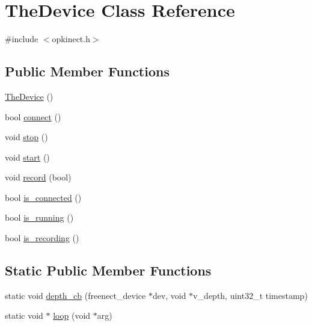 \hypertarget{class_the_device}{\section{The\+Device Class Reference}
\label{class_the_device}
}


{\ttfamily \#include $<$opkinect.\+h$>$}

\subsection*{Public Member Functions}
\begin{DoxyCompactItemize}
\item 
\hyperlink{class_the_device_a397d63518536d848541fbcb564062e91}{The\+Device} ()
\item 
bool \hyperlink{class_the_device_aaad601e00c361e996176237ce5a219c5}{connect} ()
\item 
void \hyperlink{class_the_device_a2b6ba68f94c5d28ba2d146312cfde405}{stop} ()
\item 
void \hyperlink{class_the_device_a99fc93db2519684bc5e6e20fb3c1b1c1}{start} ()
\item 
void \hyperlink{class_the_device_a1e91e4f9382c7aaae2930623f7cadcc8}{record} (bool)
\item 
bool \hyperlink{class_the_device_af983b1f813f7d4287358098c61a98107}{is\+\_\+connected} ()
\item 
bool \hyperlink{class_the_device_a82a0327fc52e2f952c3c9c705094459c}{is\+\_\+running} ()
\item 
bool \hyperlink{class_the_device_a9f3adcc1ff86d8ee612174ad65968181}{is\+\_\+recording} ()
\end{DoxyCompactItemize}
\subsection*{Static Public Member Functions}
\begin{DoxyCompactItemize}
\item 
static void \hyperlink{class_the_device_a2296ca12439d1c640c215453eaf91966}{depth\+\_\+cb} (freenect\+\_\+device $\ast$dev, void $\ast$v\+\_\+depth, uint32\+\_\+t timestamp)
\item 
static void $\ast$ \hyperlink{class_the_device_a03f2256b5a3ccdbb6e73dcfb1d19a7c2}{loop} (void $\ast$arg)
\end{DoxyCompactItemize}
